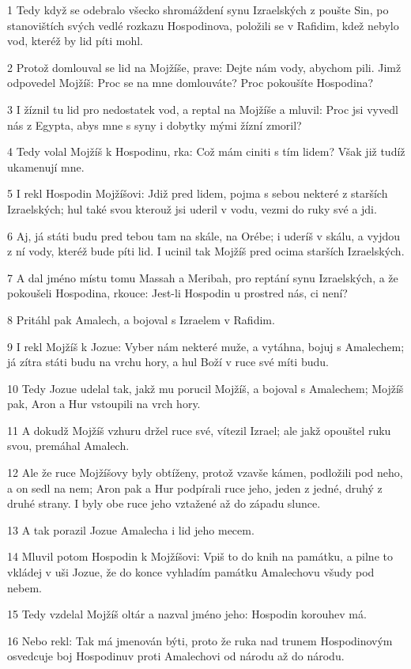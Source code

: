 \par 1 Tedy když se odebralo všecko shromáždení synu Izraelských z poušte Sin, po stanovištích svých vedlé rozkazu Hospodinova, položili se v Rafidim, kdež nebylo vod, kteréž by lid píti mohl.
\par 2 Protož domlouval se lid na Mojžíše, prave: Dejte nám vody, abychom pili. Jimž odpovedel Mojžíš: Proc se na mne domlouváte? Proc pokoušíte Hospodina?
\par 3 I žíznil tu lid pro nedostatek vod, a reptal na Mojžíše a mluvil: Proc jsi vyvedl nás z Egypta, abys mne s syny i dobytky mými žízní zmoril?
\par 4 Tedy volal Mojžíš k Hospodinu, rka: Což mám ciniti s tím lidem? Však již tudíž ukamenují mne.
\par 5 I rekl Hospodin Mojžíšovi: Jdiž pred lidem, pojma s sebou nekteré z starších Izraelských; hul také svou kterouž jsi uderil v vodu, vezmi do ruky své a jdi.
\par 6 Aj, já státi budu pred tebou tam na skále, na Orébe; i uderíš v skálu, a vyjdou z ní vody, kteréž bude píti lid. I ucinil tak Mojžíš pred ocima starších Izraelských.
\par 7 A dal jméno místu tomu Massah a Meribah, pro reptání synu Izraelských, a že pokoušeli Hospodina, rkouce: Jest-li Hospodin u prostred nás, ci není?
\par 8 Pritáhl pak Amalech, a bojoval s Izraelem v Rafidim.
\par 9 I rekl Mojžíš k Jozue: Vyber nám nekteré muže, a vytáhna, bojuj s Amalechem; já zítra státi budu na vrchu hory, a hul Boží v ruce své míti budu.
\par 10 Tedy Jozue udelal tak, jakž mu porucil Mojžíš, a bojoval s Amalechem; Mojžíš pak, Aron a Hur vstoupili na vrch hory.
\par 11 A dokudž Mojžíš vzhuru držel ruce své, vítezil Izrael; ale jakž opouštel ruku svou, premáhal Amalech.
\par 12 Ale že ruce Mojžíšovy byly obtíženy, protož vzavše kámen, podložili pod neho, a on sedl na nem; Aron pak a Hur podpírali ruce jeho, jeden z jedné, druhý z druhé strany. I byly obe ruce jeho vztažené až do západu slunce.
\par 13 A tak porazil Jozue Amalecha i lid jeho mecem.
\par 14 Mluvil potom Hospodin k Mojžíšovi: Vpiš to do knih na památku, a pilne to vkládej v uši Jozue, že do konce vyhladím památku Amalechovu všudy pod nebem.
\par 15 Tedy vzdelal Mojžíš oltár a nazval jméno jeho: Hospodin korouhev má.
\par 16 Nebo rekl: Tak má jmenován býti, proto že ruka nad trunem Hospodinovým osvedcuje boj Hospodinuv proti Amalechovi od národu až do národu.

